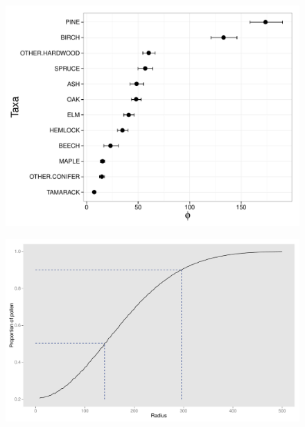\begin{figure}
\centering
\includegraphics[width=7in]{figures/phi.pdf}
\caption{}
\label{fig:phi}
\end{figure}

\begin{figure}
\centering
\includegraphics[width=7in]{figures/dispersal_vs_distance.pdf}
\caption{}
\label{fig:dvd}
\end{figure}

